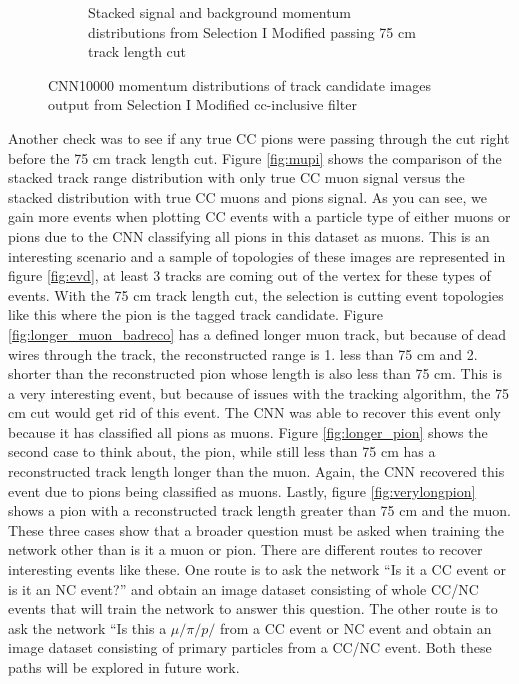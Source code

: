 \begin{figure}[htp!]
\begin{subfigure}[b]{.45\textwidth}
	\caption{Stacked signal and background momentum distributions from Selection I Modified passing 75 cm track length cut}
	\label{fig:sel1mod_momentum_stackedoriginal}
	\end{subfigure}
	\quad
\caption{CNN10000 momentum distributions of track candidate images output from Selection I Modified cc-inclusive filter}
\label{fig:sel1mod_parP}
\end{figure}

Another check was to see if any true CC pions were passing through the cut right before the 75 cm track length cut. Figure \ref{fig:mupi} shows the comparison of the stacked track range distribution with only true CC muon signal versus the stacked distribution with true CC muons and pions signal. As you can see, we gain more events when plotting CC events with a particle type of either muons or pions due to the CNN classifying all pions in this dataset as muons. This is an interesting scenario and a sample of topologies of these images are represented in figure \ref{fig:evd}, at least 3 tracks are coming out of the vertex for these types of events. With the 75 cm track length cut, the selection is cutting event topologies like this where the pion is the tagged track candidate. Figure \ref{fig:longer_muon_badreco} has a defined longer muon track, but because of dead wires through the track, the reconstructed range is 1. less than 75 cm and 2. shorter than the reconstructed pion whose length is also less than 75 cm. This is a very interesting event, but because of issues with the tracking algorithm, the 75 cm cut would get rid of this event. The CNN was able to recover this event only because it has classified all pions as muons. Figure \ref{fig:longer_pion} shows the second case to think about, the pion, while still less than 75 cm has a reconstructed track length longer than the muon. Again, the CNN recovered this event due to pions being classified as muons. Lastly, figure \ref{fig:verylongpion} shows a pion with a reconstructed track length greater than 75 cm and the muon. These three cases show that a broader question must be asked when training the network other than is it a muon or pion. There are different routes to recover interesting events like these. One route is to ask the network ``Is it a CC event or is it an NC event?'' and obtain an image dataset consisting of whole CC/NC events that will train the network to answer this question. The other route is to ask the network ``Is this a $\mu/\pi/p/$ from a CC event or NC event and obtain an image dataset consisting of primary particles from a CC/NC event. Both these paths will be explored in future work.     

